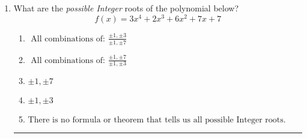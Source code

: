 \documentclass[14pt]{extbook}
\newcommand{\litem}[1]{\item#1\hspace*{-1cm}\rule{\textwidth}{0.4pt}}
\begin{document}
\begin{enumerate}
{\begin{enumerate}[label=\Alph*.]
\end{enumerate} }
\litem{
What are the \textit{possible Integer} roots of the polynomial below?\[ f(x) = 3x^{4} +2 x^{3} +6 x^{2} +7 x + 7 \]\begin{enumerate}[label=\Alph*.]
\item \( \text{ All combinations of: }\frac{\pm 1,\pm 3}{\pm 1,\pm 7} \)
\item \( \text{ All combinations of: }\frac{\pm 1,\pm 7}{\pm 1,\pm 3} \)
\item \( \pm 1,\pm 7 \)
\item \( \pm 1,\pm 3 \)
\item \( \text{There is no formula or theorem that tells us all possible Integer roots.} \)

\end{enumerate} }
\end{enumerate}
\end{document}
